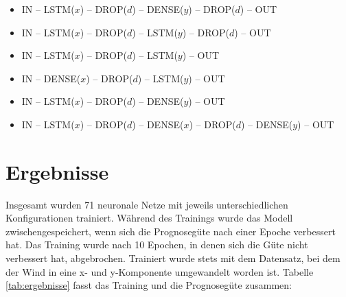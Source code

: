 \documentclass[
12pt, %
toc=listofnumbered, %
toc=chapterentrydotfill, %
numbers=noenddot, %
captions=tableheading, %
bibliography=numbered
]{scrreprt}
\let\Oldsection\section
\renewcommand{\section}{\FloatBarrier\Oldsection}
\begin{document}
\begin{itemize}
\begin{itemize}
		\begin{itemize}
			\item IN – LSTM($x$) – DROP($d$) – DENSE($y$) – DROP($d$) – OUT
			\item IN – LSTM($x$) – DROP($d$) – LSTM($y$) – DROP($d$) – OUT
			\item IN – LSTM($x$) – DROP($d$) – LSTM($y$) – OUT
			\item IN – DENSE($x$) – DROP($d$) – LSTM($y$) – OUT
			\item IN – LSTM($x$) – DROP($d$) – DENSE($y$) – OUT
			\item IN – LSTM($x$) – DROP($d$) – DENSE($x$) – DROP($d$) – DENSE($y$) – OUT

		\end{itemize}


		
	\end{itemize}
\end{itemize}


\section{Ergebnisse}\label{section:ergebnisse_training}
Insgesamt wurden 71 neuronale Netze mit jeweils unterschiedlichen Konfigurationen trainiert. Während des Trainings wurde das Modell zwischengespeichert, wenn sich die Prognosegüte nach einer Epoche verbessert hat. Das Training wurde nach 10 Epochen, in denen sich die Güte nicht verbessert hat, abgebrochen. Trainiert wurde stets mit dem Datensatz, bei dem der Wind in eine x- und y-Komponente umgewandelt worden ist. Tabelle \ref{tab:ergebnisse} fasst das Training und die Prognosegüte zusammen:
\end{document}
